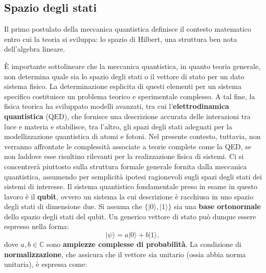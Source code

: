 \documentclass[a4paper,12pt]{report}
\theoremstyle{plain}
\begin{document}
\subsection{Spazio degli stati}
Il primo postulato della meccanica quantistica definisce il contesto matematico entro cui la teoria si sviluppa:  
lo spazio di Hilbert, una struttura ben nota dell'algebra lineare.  
\begin{center}
\end{center}
È importante sottolineare che la meccanica quantistica, in quanto teoria generale, non determina quale sia lo spazio degli stati o il vettore di stato per un dato sistema fisico. La determinazione esplicita di questi elementi per un sistema specifico costituisce un problema teorico e sperimentale complesso. A tal fine, la fisica teorica ha sviluppato modelli avanzati, tra cui l'\textbf{elettrodinamica quantistica} (QED), che fornisce una descrizione accurata delle interazioni tra luce e materia e stabilisce, tra l'altro, gli spazi degli stati adeguati per la modellizzazione quantistica di atomi e fotoni.  
Nel presente contesto, tuttavia, non verranno affrontate le complessità associate a teorie complete come la QED, se non laddove esse risultino rilevanti per la realizzazione fisica di sistemi. Ci si concentrerà piuttosto sulla struttura formale generale fornita dalla meccanica quantistica, assumendo per semplicità ipotesi ragionevoli sugli spazi degli stati dei sistemi di interesse.  
Il sistema quantistico fondamentale preso in esame in questo lavoro è il \textbf{qubit}, ovvero un sistema la cui descrizione è racchiusa in uno spazio degli stati di dimensione due. Si assuma che \(\{|0\rangle, |1\rangle\}\) sia una \textbf{base ortonormale} dello spazio degli stati del qubit. Un generico vettore di stato può dunque essere espresso nella forma:  
\[
|\psi\rangle = a|0\rangle + b|1\rangle,
\]
dove \( a, b \in \mathbb{C} \) sono \textbf{ampiezze complesse di probabilità}. La condizione di \textbf{normalizzazione}, che assicura che il vettore sia unitario (ossia abbia norma unitaria), è espressa come:
\end{document}
